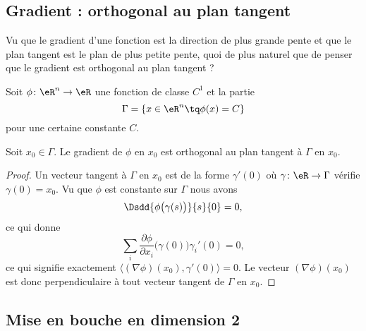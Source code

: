 \subsection{Gradient : orthogonal au plan tangent}

Vu que le gradient d'une fonction est la direction de plus grande pente et que le plan tangent est le plan de plus petite pente, quoi de plus naturel que de penser que le gradient est orthogonal au plan tangent ?

\begin{lemma}
    Soit \( \phi\colon \eR^n\to \eR\) une fonction de classe \( C^1\) et la partie
    \begin{equation}
        \Gamma=\{ x\in \eR^n\tq \phi(x)=C \}
    \end{equation}
    pour une certaine constante \( C\).

    Soit \( x_0\in \Gamma\). Le gradient de \( \phi\) en \( x_0\) est orthogonal au plan tangent à \( \Gamma\) en \( x_0\).
\end{lemma}

\begin{proof}
    Un vecteur tangent à \( \Gamma\) en \( x_0\) est de la forme \( \gamma'(0)\) où \( \gamma\colon \eR \to \Gamma\) vérifie \( \gamma(0)=x_0\). Vu que \( \phi\) est constante sur \( \Gamma\) nous avons
    \begin{equation}
        \Dsdd{ \phi\big( \gamma(s) \big) }{s}{0}=0,
    \end{equation}
    ce qui donne
    \begin{equation}
        \sum_i\frac{ \partial \phi }{ \partial x_i }\big( \gamma(0) \big)\gamma_i'(0)=0,
    \end{equation}
    ce qui signifie exactement \( \langle (\nabla\phi)(x_0), \gamma'(0)\rangle=0\). Le vecteur \( (\nabla\phi)(x_0)\) est donc perpendiculaire à tout vecteur tangent de \( \Gamma\) en \( x_0\).
\end{proof}

\subsection{Mise en bouche en dimension 2}

